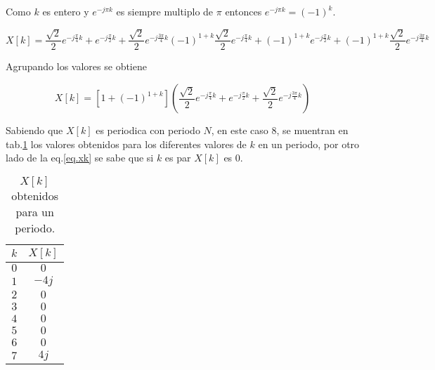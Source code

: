 \documentclass[letterpaper]{article}
\begin{document}
Como $k$ es entero y $e^{-j\pi k}$ es siempre multiplo de $\pi$ entonces $e^{-j\pi k} = (-1)^k$.

\begin{equation}
    X[k] = \frac{\sqrt{2}}{2} e^{-j\frac{\pi }{4}k} + e^{-j\frac{\pi }{2}k} + \frac{\sqrt{2}}{2} e^{-j\frac{3\pi }{4}k}
    (-1)^{1+k} \frac{\sqrt{2}}{2} e^{-j\frac{\pi }{4}k} +(-1)^{1+k} e^{-j\frac{\pi }{2}k} + (-1)^{1+k}\frac{\sqrt{2}}{2} e^{-j\frac{3\pi }{4}k} 
\end{equation}

Agrupando los valores se obtiene 

\begin{equation}
    X[k]= [ 1 + (-1)^{1+k} ] ( \frac{\sqrt{2}}{2} e^{-j\frac{\pi }{4}k} +e^{-j\frac{\pi }{2}k} + 
    \frac{\sqrt{2}}{2}  e^{-j\frac{3\pi }{4}k} )
    \label{eq.xk}
\end{equation}


Sabiendo que $X[k]$ es periodica con periodo $N$, en este caso $8$, se muentran en tab.\ref{tab.xk} los valores obtenidos para 
los diferentes valores de $k$ en un periodo, por otro lado de la eq.\ref{eq.xk} se sabe que si $k$ es par $X[k]$ es $0$.

\begin{table}[H]
    \centering
    \begin{tabular}{|c|c|}
        \hline $k$ & $X[k]$ \\ 
        \hline $0$ & $0$ \\ 
        \hline $1$ & $-4j$ \\ 
        \hline $2$ & $0$ \\ 
        \hline $3$ & $0$ \\ 
        \hline $4$ & $0$ \\ 
        \hline $5$ & $0$ \\ 
        \hline $6$ & $0$ \\ 
        \hline $7$ & $4j$ \\ 
        \hline 
        
    \end{tabular}
    \caption{$X[k]$ obtenidos para un periodo.}
    \label{tab.xk}

\end{table}
\end{document}
